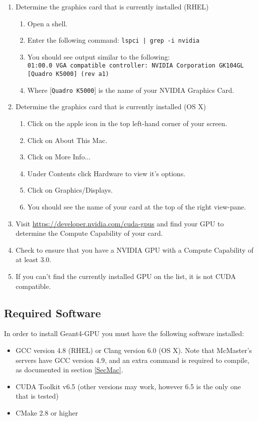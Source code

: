 \documentclass[12pt]{article}
\begin{document}
\begin{enumerate}
\item Determine the graphics card that is currently installed (RHEL)
\begin{enumerate}
\item Open a shell.
\item Enter the following command: \texttt{lspci | grep -i nvidia}
\item You should see output similar to the following:\\
\texttt{01:00.0 VGA compatible controller: NVIDIA Corporation GK104GL}\\
\texttt{[Quadro K5000] (rev a1)}
\item Where [\texttt{Quadro K5000}] is the name of your NVIDIA Graphics Card.
\end{enumerate}

\item Determine the graphics card that is currently installed (OS X)
\begin{enumerate}
\item Click on the apple icon in the top left-hand corner of your screen.
\item Click on About This Mac.
\item Click on More Info...
\item Under Contents click Hardware to view it's options.
\item Click on Graphics/Displays.
\item You should see the name of your card at the top of the right view-pane.
\end{enumerate}

\item Visit \url{https://developer.nvidia.com/cuda-gpus} and find your GPU to determine the Compute Capability of your card.
\item Check to ensure that you have a NVIDIA GPU with a  Compute Capability of at least 3.0.
\item If you can't find the currently installed GPU on the list, it is not CUDA compatible.
\end{enumerate}

\subsection{Required Software} %
In order to install Geant4-GPU you must have the following software installed:
\begin{itemize}
\item GCC version 4.8 (RHEL) or Clang version 6.0 (OS X). Note that McMaster's servers have GCC version 4.9, and an extra command is required to compile, as documented in section \ref{SecMac}.
\item CUDA Toolkit v6.5 (other versions may work, however 6.5 is the only one that is tested)
\item CMake 2.8 or higher
\end{itemize}
\end{document}
